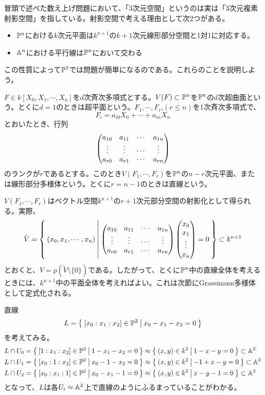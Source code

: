 \documentclass{ltjsreport}
\begin{document}
冒頭で述べた数え上げ問題において、「3次元空間」というのは実は「3次元複素射影空間」を指している。射影空間で考える理由として次2つがある。
\begin{itemize}
  \item $\mathbb{P}^n$における$k$次元平面は$k^{n+1}$の$k+1$次元線形部分空間と1対1に対応する。
  \item $\mathbb{A}^n$における平行線は$\mathbb{P}^n$において交わる
\end{itemize}
この性質によって$\mathbb{P}^3$では問題が簡単になるのである。これらのことを説明しよう。

\begin{defin}
  $F\in k[X_0,X_1,\cdots,X_n]$を$d$次斉次多項式とする。$V(F)\subset\mathbb{P}^n$を$\mathbb{P}^n$の$d$次超曲面という。とくに$d=1$のときは超平面という。$F_1,\cdots,F_r$,$(r\leq n)$を1次斉次多項式で、
  \[
  F_i=a_{i0}X_0+\cdots+a_{in}X_n
  \]
  とおいたとき、行列
  \[
  \begin{pmatrix} 
    a_{10} & a_{11} & \cdots & a_{1n}\\
    \vdots & \vdots & \cdots & \vdots \\
    a_{r0} & a_{r1} & \cdots & a_{rn}
   \end{pmatrix} 
  \]
  のランクが$r$であるとする。このとき$V(F_1,\cdots,F_r)$を$\mathbb{P}^n$の$n-r$次元平面、または線形部分多様体という。とくに$r=n-1$のときは直線という。
\end{defin}

$V(F_1,\cdots,F_r)$はベクトル空間$k^{n+1}$の$r+1$次元部分空間の射影化として得られる。実際、
\[
\tilde{V}=\left\{\:(x_0,x_1,\cdots,x_n)\:\middle|\:\begin{pmatrix} 
    a_{10} & a_{11} & \cdots & a_{1n}\\
    \vdots & \vdots & \cdots & \vdots \\
    a_{r0} & a_{r1} & \cdots & a_{rn}
 \end{pmatrix}\begin{pmatrix} x_0\\x_1\\\vdots\\x_n \end{pmatrix}=0\:\right\}\subset k^{n+1}
\]
とおくと、$V=p(\tilde{V}\setminus\{0\})$である。したがって、とくに$\mathbb{P}^n$中の直線全体を考えるときには、$k^{n+1}$中の平面全体を考えればよい。これは次節にGrassmann多様体として定式化される。

\begin{eg}
  直線
  \[
  L=\left\{\:[x_0:x_1:x_2]\in\mathbb{P}^2\:\middle|\:x_0-x_1-x_2=0\:\right\}  
  \]
  を考えてみる。
  \begin{align*}
  &L\cap U_0=\left\{\:[1:x_1:x_2]\in\mathbb{P}^2\:\middle|\:1-x_1-x_2=0\:\right\} \approx \left\{\:(x,y)\in k^2\:\middle|\:1-x-y=0\:\right\}\subset \mathbb{A}^2\\
  &L\cap U_1=\left\{\:[x_0:1:x_2]\in\mathbb{P}^2\:\middle|\:x_0-1-x_2=0\:\right\}
  \approx \left\{\:(x,y)\in k^2\:\middle|\:-1+x-y=0\:\right\}\subset \mathbb{A}^2\\
  &L\cap U_2=\left\{\:[x_0:x_1:1]\in\mathbb{P}^2\:\middle|\:x_0-x_1-1=0\:\right\}
  \approx \left\{\:(x,y)\in k^2\:\middle|\:x-y-1=0\:\right\}\subset \mathbb{A}^2
  \end{align*}
  となって、$L$は各$U_i\approx \mathbb{A}^2$上で直線のようにふるまっていることがわかる。
\end{eg}
\end{document}
